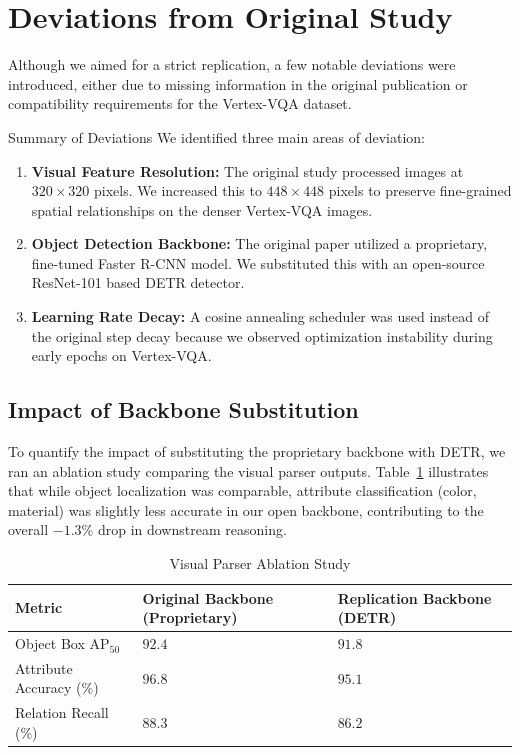 \section{Deviations from Original Study}
\label{sec:deviations}
Although we aimed for a strict replication, a few notable deviations were introduced, either due to missing information in the original publication or compatibility requirements for the Vertex-VQA dataset.

\begin{deviationbox}{Summary of Deviations}
We identified three main areas of deviation:
\begin{enumerate}
    \item \textbf{Visual Feature Resolution:} The original study processed images at $320 \times 320$ pixels. We increased this to $448 \times 448$ pixels to preserve fine-grained spatial relationships on the denser Vertex-VQA images.
    \item \textbf{Object Detection Backbone:} The original paper utilized a proprietary, fine-tuned Faster R-CNN model. We substituted this with an open-source ResNet-101 based DETR detector.
    \item \textbf{Learning Rate Decay:} A cosine annealing scheduler was used instead of the original step decay because we observed optimization instability during early epochs on Vertex-VQA.
\end{enumerate}
\end{deviationbox}

\subsection{Impact of Backbone Substitution}
To quantify the impact of substituting the proprietary backbone with DETR, we ran an ablation study comparing the visual parser outputs.
Table~\ref{tab:ablation} illustrates that while object localization was comparable, attribute classification (color, material) was slightly less accurate in our open backbone, contributing to the overall $-1.3\%$ drop in downstream reasoning.

\begin{table}[H]
\centering
\caption{Visual Parser Ablation Study}
\label{tab:ablation}
\begin{tabularx}{\textwidth}{l X X}
\toprule
\textbf{Metric} & \textbf{Original Backbone (Proprietary)} & \textbf{Replication Backbone (DETR)} \\
\midrule
Object Box AP$_{50}$ & $92.4$ & $91.8$ \\
Attribute Accuracy (\%) & $96.8$ & $95.1$ \\
Relation Recall (\%)    & $88.3$ & $86.2$ \\
\bottomrule
\end{tabularx}
\end{table}

